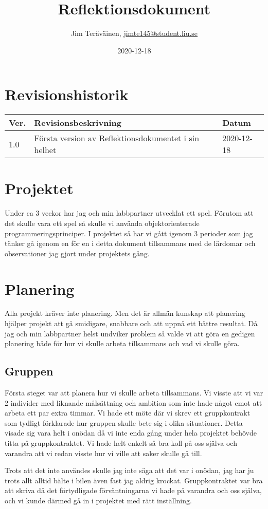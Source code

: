 \documentclass{TDP005mall}
\author{Jim Teräväinen, \url{jimte145@student.liu.se}}
\title{Reflektionsdokument}
\date{2020-12-18}
\begin{document}
\projectpage
\section{Revisionshistorik}
\begin{table}[!h]
\begin{tabularx}{\linewidth}{|l|X|l|}
\hline
Ver. & Revisionsbeskrivning & Datum \\\hline
1.0 & Första version av Reflektionsdokumentet i sin helhet & 2020-12-18 \\\hline
\end{tabularx}
\end{table}

\section{Projektet}
Under ca 3 veckor har jag och min labbpartner utvecklat ett spel. Förutom att det skulle vara ett spel så skulle vi använda objektorienterade programmeringsprinciper. I projektet så har vi gått igenom 3 perioder som jag tänker gå igenom en för en i detta dokument tillsammans med de lärdomar och observationer jag gjort under projektets gång.

\section{Planering}
Alla projekt kräver inte planering. Men det är allmän kunskap att planering hjälper projekt att gå smidigare, snabbare och att uppnå ett bättre resultat. Då jag och min labbpartner helst undviker problem så valde vi att göra en gedigen planering både för hur vi skulle arbeta tillsammans och vad vi skulle göra.

\subsection{Gruppen}
Första steget var att planera hur vi skulle arbeta tillsammans. Vi visste att vi var 2 individer med liknande målsättning och ambition som inte hade något emot att arbeta ett par extra timmar. Vi hade ett möte där vi skrev ett gruppkontrakt som tydligt förklarade hur gruppen skulle bete sig i olika situationer. Detta visade sig vara helt i onödan då vi inte enda gång under hela projektet behövde titta på gruppkontraktet. Vi hade helt enkelt så bra koll på oss själva och varandra att vi redan visste hur vi ville att saker skulle gå till.

Trots att det inte användes skulle jag inte säga att det var i onödan, jag har ju trots allt alltid bälte i bilen även fast jag aldrig krockat. Gruppkontraktet var bra att skriva då det förtydligade förväntningarna vi hade på varandra och oss själva, och vi kunde därmed gå in i projektet med rätt inställning.
\end{document}
